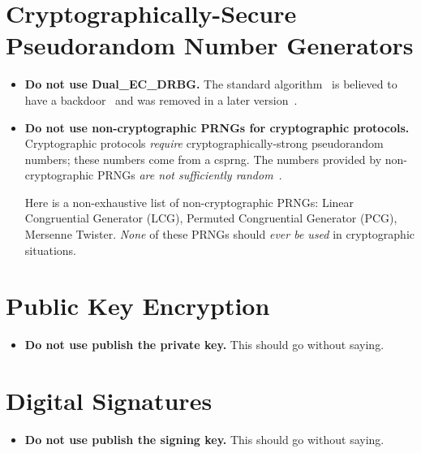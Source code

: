 \section{Cryptographically-Secure Pseudorandom Number Generators}

\begin{itemize}
\item \textbf{Do not use Dual\_EC\_DRBG.}
    The standard algorithm~\cite[Section~10.3.1]{NIST-SP-800-90A}
    is believed to have a backdoor~\cite{BernsteinDualEC}
    and was removed in a later version~\cite{NIST-SP-800-90ARev1}.
\item \textbf{Do not use non-cryptographic PRNGs for cryptographic protocols.}
    Cryptographic protocols \emph{require} cryptographically-strong
    pseudorandom numbers;
    these numbers come from a \gls{csprng}.
    The numbers provided by non-cryptographic PRNGs
    \emph{are not sufficiently random}~\cite{marsaglia1968random,bouillaguet2020practical}.

    Here is a non-exhaustive list of non-cryptographic PRNGs:
    Linear Congruential Generator (LCG), Permuted Congruential Generator (PCG),
    Mersenne Twister.
    \emph{None} of these PRNGs should \emph{ever be used}
    in cryptographic situations.
\end{itemize}

\section{Public Key Encryption}

\begin{itemize}
\item \textbf{Do not use publish the private key.}
    This should go without saying.
\end{itemize}

\section{Digital Signatures}

\begin{itemize}
\item \textbf{Do not use publish the signing key.}
    This should go without saying.
\end{itemize}

